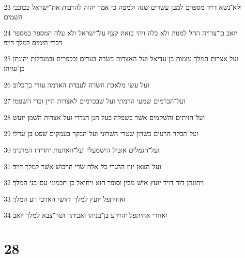 \par 23 ולא־נשׂא דויד מספרם למבן עשׂרים שׁנה ולמטה כי אמר יהוה להרבות את־ישׂראל ככוכבי השׁמים׃
\par 24 יואב בן־צרויה החל למנות ולא כלה ויהי בזאת קצף על־ישׂראל ולא עלה המספר במספר דברי־הימים למלך דויד׃
\par 25 ועל אצרות המלך עזמות בן־עדיאל ועל האצרות בשׂדה בערים ובכפרים ובמגדלות יהונתן בן־עזיהו׃
\par 26 ועל עשׂי מלאכת השׂדה לעבדת האדמה עזרי בן־כלוב׃
\par 27 ועל־הכרמים שׁמעי הרמתי ועל שׁבכרמים לאצרות היין זבדי השׁפמי׃
\par 28 ועל־הזיתים והשׁקמים אשׁר בשׁפלה בעל חנן הגדרי ועל־אצרות השׁמן יועשׁ׃
\par 29 ועל־הבקר הרעים בשׁרון שׁטרי השׁרוני ועל־הבקר בעמקים שׁפט בן־עדלי׃
\par 30 ועל־הגמלים אוביל הישׁמעלי ועל־האתנות יחדיהו המרנתי׃
\par 31 ועל־הצאן יזיז ההגרי כל־אלה שׂרי הרכושׁ אשׁר למלך דויד׃
\par 32 ויהונתן דוד־דויד יועץ אישׁ־מבין וסופר הוא ויחיאל בן־חכמוני עם־בני המלך׃
\par 33 ואחיתפל יועץ למלך וחושׁי הארכי רע המלך׃
\par 34 ואחרי אחיתפל יהוידע בן־בניהו ואביתר ושׂר־צבא למלך יואב׃

\chapter{28}

